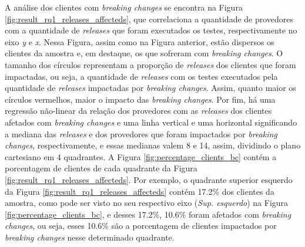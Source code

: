 A análise dos clientes com \textit{breaking changes} se encontra na Figura \ref{fig:result_rq1_releases_affecteds}, que correlaciona a quantidade de provedores com a quantidade de \textit{releases} que foram executados os testes, respectivamente no eixo \textit{y} e \textit{x}. Nessa Figura, assim como na Figura anterior, estão dispersos os clientes da amostra e, em destaque, os que sofreram com \textit{breaking changes}. O tamanho dos círculos  representam a proporção de \textit{releases} dos clientes que foram impactadas, ou seja, a quantidade de \textit{releases} com os testes executados pela quantidade de \textit{releases} impactadas por \textit{breaking changes}. Assim, quanto maior os círculos vermelhos, maior o impacto das \textit{breaking changes}. Por fim, há uma regressão não-linear da relação dos provedores com as \textit{releases} dos clientes afetados com \textit{breaking changes} e uma linha vertical e uma horizontal significando a mediana das \textit{releases} e dos provedores que foram impactados por \textit{breaking changes}, respectivamente, e essas medianas valem 8 e 14, assim, dividindo o plano cartesiano em 4 quadrantes. A Figura \ref{fig:percentage_clients_bc} contém a porcentagem de clientes de cada quadrante da Figura \ref{fig:result_rq1_releases_affecteds}. Por exemplo, o quadrante superior esquerdo da Figura \ref{fig:result_rq1_releases_affecteds} contém 17.2\% dos clientes da amostra, como pode ser visto no seu respectivo eixo (\textit{Sup. esquerdo}) na Figura \ref{fig:percentage_clients_bc}, e desses 17.2\%, 10.6\% foram afetados com \textit{breaking changes}, ou seja, esses 10.6\% são a porcentagem de clientes impactados por \textit{breaking changes} nesse determinado quadrante.

